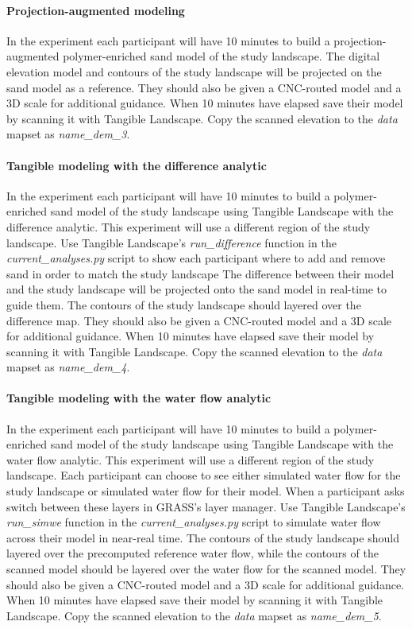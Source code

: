\documentclass[prodmode,acmtochi]{acmsmall} %
\begin{document}
\paragraph{Projection-augmented modeling}
In the  experiment
each participant will have 10 minutes to build 
a projection-augmented polymer-enriched sand model
of the study landscape.
The digital elevation model and contours of the study landscape 
will be projected on the sand model as a reference. 
They should also be given a CNC-routed model 
and a 3D scale for additional guidance. 
%
When 10 minutes have elapsed 
save their model by scanning it with Tangible Landscape.
Copy the scanned elevation to the \emph{data} mapset
as \emph{name{\_}dem{\_}3}.

\paragraph{Tangible modeling with the difference analytic}
In the  experiment
each participant will have 10 minutes to build 
a polymer-enriched sand model
of the study landscape 
using Tangible Landscape with the difference analytic.
This experiment will use a different region of the study landscape. 
Use Tangible Landscape's \emph{run{\_}difference} function 
in the \emph{current{\_}analyses.py} script 
to show each participant where to add and remove sand 
in order to match the study landscape
The difference between their model and the study landscape
will be projected onto the sand model in real-time
to guide them. 
The contours of the study landscape should layered
over the difference map. 
They should also be given a CNC-routed model 
and a 3D scale for additional guidance. 
%
When 10 minutes have elapsed 
save their model by scanning it with Tangible Landscape.
Copy the scanned elevation to the \emph{data} mapset
as \emph{name{\_}dem{\_}4}.

\paragraph{Tangible modeling with the water flow analytic}
In the  experiment
each participant will have 10 minutes to build 
a polymer-enriched sand model
of the study landscape 
using Tangible Landscape with the water flow analytic.
This experiment will use a different region of the study landscape. 
Each participant can choose to see either
simulated water flow for the study landscape
or simulated water flow for their model. 
When a participant asks
switch between these layers 
in GRASS's layer manager. 
Use Tangible Landscape's \emph{run{\_}simwe} function 
in the \emph{current{\_}analyses.py} script 
to simulate water flow across their model in near-real time.
The contours of the study landscape should layered
over the precomputed reference water flow, 
while the contours of the scanned model should be layered
over the water flow for the scanned model. 
They should also be given a CNC-routed model 
and a 3D scale for additional guidance. 
%
When 10 minutes have elapsed 
save their model by scanning it with Tangible Landscape.
Copy the scanned elevation to the \emph{data} mapset
as \emph{name{\_}dem{\_}5}.
\end{document}
